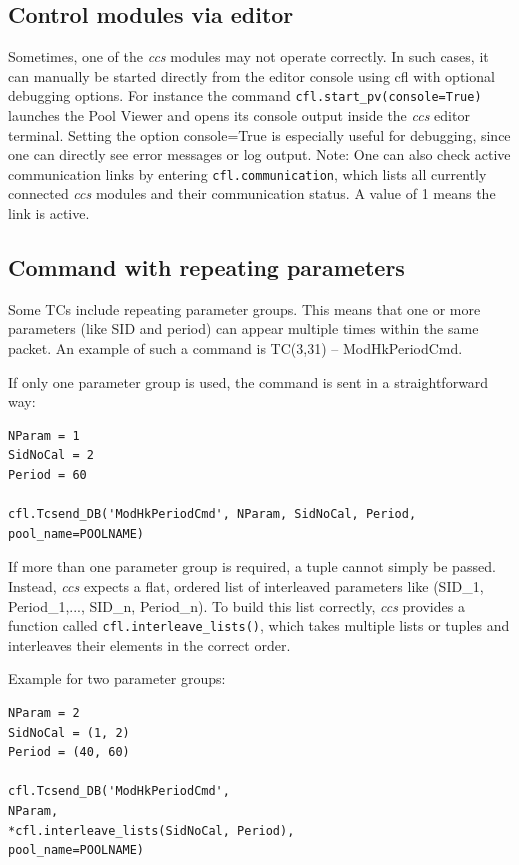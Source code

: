\subsection{Control modules via editor}
Sometimes, one of the \textit{ccs} modules may not operate correctly. In such cases, it can manually be started directly from the editor console using cfl with optional debugging options. 
For instance the command \texttt{cfl.start\_pv(console=True)} launches the Pool Viewer and opens its console output inside the \textit{ccs} editor terminal.
Setting the option console=True is especially useful for debugging, since one can directly see error messages or log output.
Note: One can also check active communication links by entering \texttt{cfl.communication}, which lists all currently connected \textit{ccs} modules and their communication status. 
A value of 1 means the link is active.

\subsection{Command with repeating parameters}
Some TCs include repeating parameter groups. This means that one or more parameters (like SID and period) can appear multiple times within the same packet. 
An example of such a command is TC(3,31) – ModHkPeriodCmd. 

If only one parameter group is used, the command is sent in a straightforward way:

\begin{verbatim}
NParam = 1 
SidNoCal = 2 
Period = 60 

cfl.Tcsend_DB('ModHkPeriodCmd', NParam, SidNoCal, Period, pool_name=POOLNAME)

\end{verbatim}


If more than one parameter group is required, a tuple cannot simply be passed. 
Instead, \textit{ccs} expects a flat, ordered list of interleaved parameters like (SID\_1, Period\_1,..., SID\_n, Period\_n). 
To build this list correctly, \textit{ccs} provides a function called \texttt{cfl.interleave\_lists()}, which takes multiple lists or tuples and interleaves their elements in the correct order.

Example for two parameter groups:
\begin{verbatim}
NParam = 2
SidNoCal = (1, 2)
Period = (40, 60)

cfl.Tcsend_DB('ModHkPeriodCmd', 
NParam, 
*cfl.interleave_lists(SidNoCal, Period), 
pool_name=POOLNAME)

\end{verbatim}

